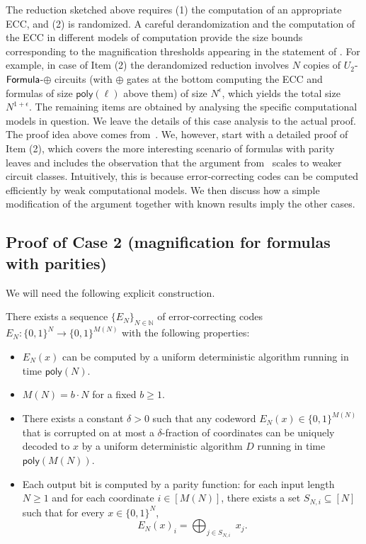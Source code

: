 \documentclass{toc}
\newcommand{\Formula}{\ensuremath{{\sf Formula}}\xspace}
\begin{document}
The reduction sketched above requires (1) the computation of an appropriate ECC, and (2) is randomized. A careful derandomization and the computation of the ECC in different models of computation provide the size bounds corresponding to the magnification thresholds appearing in the statement of . For example, in case of Item (2) the derandomized reduction involves $N$ copies of $U_2$-$\Formula$-$\oplus$ circuits (with $\oplus$ gates at the bottom computing the ECC and formulas of size $\mathsf{poly}(\ell)$ above them) of size $N^{\epsilon}$, which yields the total size $N^{1+\epsilon}$. The remaining items are obtained by analysing the specific computational models in question. We leave the details of this case analysis to the actual proof.\\


The proof idea above comes from~\cite{OS18}. We, however, start with a detailed proof of Item (2), which covers the more interesting scenario of formulas with parity leaves and includes the observation that the argument from~\cite{OS18} scales to weaker circuit classes. Intuitively, this is because error-correcting codes can be computed efficiently by weak computational models. We then discuss how a simple modification of the argument together with known results imply the other cases.


\subsection{Proof of  Case 2 (magnification for formulas with parities)}\label{ss:magnification_formulas}

We will need the following explicit construction.

\begin{theorem} \label{thm:code} There exists a sequence $\{E_N\}_{N \in \mathbb{N}}$ of error-correcting codes $E_N \colon \{0,1\}^N \to \{0,1\}^{M(N)}$ with the following properties:
\vspace{0.1cm}
\begin{itemize}
\item $E_N(x)$ can be computed by a uniform deterministic algorithm running in time $\mathsf{poly}(N)$.
\item $M(N) = b \cdot N$ for a fixed $b \geq 1$.
\item There exists a constant $\delta > 0$ such that any codeword $E_N(x) \in \{0,1\}^{M(N)}$ that is corrupted on at most a $\delta$-fraction of coordinates can be uniquely decoded to $x$ by a uniform deterministic algorithm $D$ running in time $\mathsf{poly}(M(N))$.
\item Each output bit is computed by a parity function: for each input length $N \geq 1$ and for each coordinate $i \in [M(N)]$, there exists a set $S_{N,i} \subseteq [N]$ such that for every $x \in \{0,1\}^N$, $$E_N(x)_i = \bigoplus_{j \in S_{N,i}} \;x_j.$$
\end{itemize}
\end{theorem}
\end{document}
